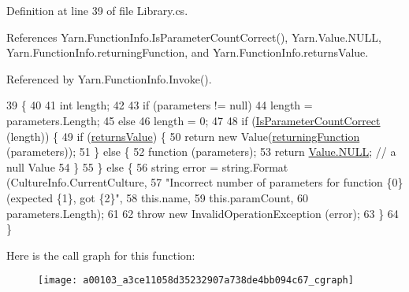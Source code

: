 Definition at line 39 of file Library.\-cs.



References Yarn.\-Function\-Info.\-Is\-Parameter\-Count\-Correct(), Yarn.\-Value.\-N\-U\-L\-L, Yarn.\-Function\-Info.\-returning\-Function, and Yarn.\-Function\-Info.\-returns\-Value.



Referenced by Yarn.\-Function\-Info.\-Invoke().


\begin{DoxyCode}
39                                                          \{
40 
41             \textcolor{keywordtype}{int} length;
42 
43             \textcolor{keywordflow}{if} (parameters != null)
44                 length = parameters.Length;
45             \textcolor{keywordflow}{else}
46                 length = 0;
47 
48             \textcolor{keywordflow}{if} (\hyperlink{a00103_a1ed09ff8aafa230a0d2bbc23cd6cd763}{IsParameterCountCorrect} (length)) \{
49                 \textcolor{keywordflow}{if} (\hyperlink{a00103_acaff044276aa230de7c0b27dd5267bc7}{returnsValue}) \{
50                     \textcolor{keywordflow}{return} \textcolor{keyword}{new} Value(\hyperlink{a00103_a8b6e0e5a875c427a1d947f3c52c308ca}{returningFunction} (parameters));
51                 \} \textcolor{keywordflow}{else} \{
52                     \textcolor{keyword}{function} (parameters);
53                     \textcolor{keywordflow}{return} \hyperlink{a00167_a1ed2964965baca8621c45efa23f37660}{Value.NULL}; \textcolor{comment}{// a null Value}
54                 \}
55             \} \textcolor{keywordflow}{else} \{
56                 \textcolor{keywordtype}{string} error = string.Format (CultureInfo.CurrentCulture,
57                     \textcolor{stringliteral}{"Incorrect number of parameters for function \{0\} (expected \{1\}, got \{2\}"},
58                     this.name,
59                     this.paramCount,
60                     parameters.Length);
61 
62                 \textcolor{keywordflow}{throw} \textcolor{keyword}{new} InvalidOperationException (error);
63             \}
64         \}
\end{DoxyCode}


Here is the call graph for this function\-:
\nopagebreak
\begin{figure}[H]
\begin{center}
\leavevmode
\texttt{[image: a00103\_a3ce11058d35232907a738de4bb094c67\_cgraph]}
\end{center}
\end{figure}




